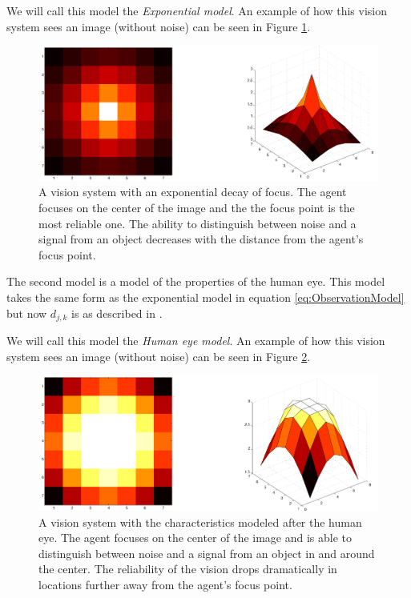 We will call this model the \emph{Exponential model}. An example of how this vision system sees an image (without noise) can be seen in Figure \ref{fig:ObsmodelExp}.

\begin{figure}[!htp]
  \centering
  \includegraphics[width=1\textwidth]{figures/obsmodel_exp}
  \caption{A vision system with an exponential decay of focus. The agent focuses on the center of the image and the the focus point is the most reliable one. The ability to distinguish between noise and a signal from an object decreases with the distance from the agent's focus point.}
  \label{fig:ObsmodelExp}
\end{figure}

The second model is a model of the properties of the human eye. This model takes the same form as the exponential model in equation \eqref{eq:ObservationModel} but now $d_{j,k}$ is as described in \cite{Najemnik2005}.

We will call this model the \emph{Human eye model}. An example of how this vision system sees an image (without noise) can be seen in Figure \ref{fig:ObsmodelCont}.

\begin{figure}[!htp]
  \centering
  \includegraphics[width=1\textwidth]{figures/obsmodel_cont}
  \caption{A vision system with the characteristics modeled after the human eye. The agent focuses on the center of the image and is able to distinguish between noise and a signal from an object in and around the center. The reliability of the vision drops dramatically in locations further away from the agent's focus point.}
  \label{fig:ObsmodelCont}
\end{figure}

